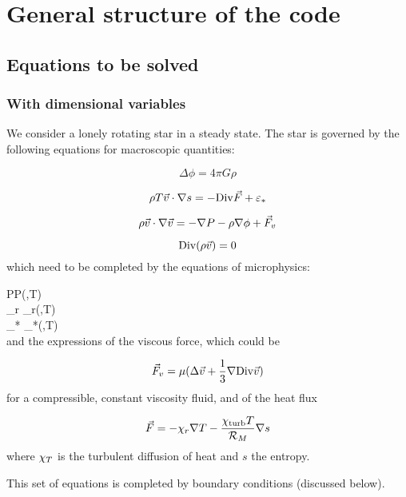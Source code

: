 \chapter{General structure of the code}


\section{Equations to be solved}

\subsection{With dimensional variables}

We consider a lonely rotating star in a steady state. The star is
governed by the following equations for macroscopic quantities:

\begin{equation} \Delta\phi = 4\pi G\rho\end{equation}

\begin{equation} \rho T \vec{v}\cdot\nabla s = -\displaystyle {\rm Div}\vec{F} + \varepsilon_*\end{equation}

\begin{equation} \rho \vec{v}\cdot\nabla\vec{v} = -\nabla P -\rho\nabla\phi+\vec{F}_v\end{equation}

\begin{equation} \displaystyle {\rm Div}(\rho\vec{v}) =0\end{equation}
which need to be completed by the equations of microphysics:

\greq
P\equiv P(\rho,T)\\
\khi_r \equiv \khi_r(\rho,T)\\
\eps_* \equiv \eps_*(\rho,T)\\
\egreq
and the expressions of the viscous force, which could be

\begin{equation} \vec{F}_v = \mu(\Delta\vec{v} + \frac{1}{3}\nabla\displaystyle {\rm Div}\vec{v})\end{equation}
for a compressible, constant viscosity fluid, and of the heat flux

\begin{equation} \vec{F} = -\chi_r\nabla T -\frac{\chi_{\rm turb}T}{{\cal R}_M}\nabla s\end{equation}
where $\chi_T$ is the turbulent diffusion of heat and $s$ the
entropy.

This set of equations is completed by boundary conditions (discussed
below).

